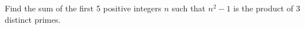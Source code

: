 Find the sum of the first 5 positive integers $n$ such that $n^2 - 1$ is the product of 3 distinct primes.
